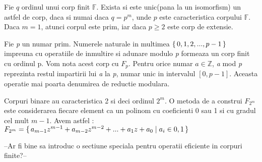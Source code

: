 \begin{teo}
Fie $q$ ordinul unui corp finit $\mathbb{F}$. Exista si este unic(pana la un isomorfism) un astfel de corp, daca si numai daca $q=p^{m}$, unde $p$ este caracteristica corpului $\mathbb{F}$. Daca $m=1$, atunci corpul este prim, iar daca $p\geq 2$ este corp de extensie.
\end{teo}

\begin{dfn}
Fie \textit{p} un numar prim. Numerele naturale in multimea $\set {0, 1, 2, ... , p-1 }$ impreuna cu operatiile de inmultire si adunare modulo \textit{p} formeaza un corp finit cu ordinul p. Vom nota acest corp cu $F_p$. Pentru orice numar $a\in\mathbb{Z}$, \textit{a} mod \textit{p} reprezinta restul impartirii lui \textit{a} la \textit{p}, numar unic in intervalul $[0, p-1]$. Aceasta operatie mai poarta denumirea de reductie modulara.
\end{dfn}

\begin{dfn}
Corpuri binare au caracteristica 2 si deci ordinul $2^{m}$. O metoda de a construi $F_{2^m}$ este considerarea fiecare element ca un polinom cu coeficienti 0 sau 1 si cu gradul cel mult $m-1$. Avem astfel : 
 $F_{2^m} = \set {a_{m-1}z^{m-1} + a_{m-2}z^{m-2} + ... + a_{1}z + a_{0}\mid a_{i}\in {0,1}}$
\end{dfn}

--Ar fi bine sa introduc o sectiune speciala pentru operatii eficiente in corpuri finite?--



